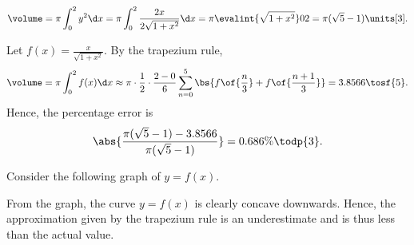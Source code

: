 \begin{solution}
    \begin{ppart}
        \[\volume = \pi \int_0^2 y^2 \d x = \pi \int_0^2 \frac{2x}{2\sqrt{1 + x^2}} \d x = \pi \evalint{\sqrt{1 + x^2}}02 = \pi(\sqrt5 - 1) \units[3].\]
    \end{ppart}
    \begin{ppart}
        Let $f(x) = \frac{x}{\sqrt{1 + x^2}}$. By the trapezium rule, \[\volume = \pi \int_0^2 f(x) \d x \approx \pi \cdot \frac12 \cdot \frac{2-0}{6} \sum_{n=0}^5 \bs{f\of{\frac{n}3} + f\of{\frac{n+1}3}} = 3.8566 \tosf{5}.\] Hence, the percentage error is \[\abs{\frac{\pi(\sqrt5 - 1) - 3.8566}{\pi(\sqrt5 - 1)}} = 0.686\% \todp{3}.\]

        Consider the following graph of $y = f(x)$.

        \begin{center}
        \end{center}
        
        From the graph, the curve $y = f(x)$ is clearly concave downwards. Hence, the approximation given by the trapezium rule is an underestimate and is thus less than the actual value.
    \end{ppart}
\end{solution}

